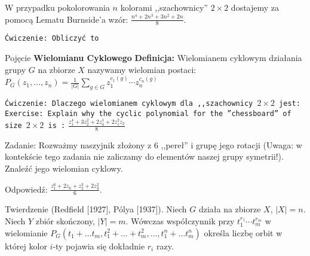 \documentclass{beamer}
\begin{document}
\begin{frame}
  W przypadku pokolorowania $n$ kolorami ,,szachownicy'' $2\times 2$
  dostajemy za pomocą Lematu Burnside'a wzór:
  $\frac{n^4 + 2 n^3 + 3 n^2 + 2 n }{8}$.

  {\tt Ćwiczenie: Obliczyć to}
  
\end{frame}

\begin{frame}
  \begin{block}{Pojęcie {\bf Wielomianu Cyklowego}}
    {\bf Definicja:} Wielomianem cyklowym działania grupy $G$
    na zbiorze $X$ nazywamy
    wielomian postaci:
    $P_G(z_1, \ldots, z_n) = \frac{1}{|G|} \sum_{g\in G} z_1^{c_1(g)} \cdots z_n^{c_n(g)}$
    
    
    \end{block}
  {\tt Ćwiczenie: Dlaczego wielomianem cyklowym dla ,,szachownicy $2\times 2$ jest:}
  {\tt Exercise: Explain why the cyclic polynomial for the ''chessboard'' of
    size $2\times 2$ is :}
  $\frac{z_1^4 + 3 z_2^2 + 2 z_4^1 + 2 z_1^2 z_2}{8}$

\end{frame}

\begin{frame}
  \begin{block}{Zadanie:}
    Rozważmy naszyjnik złożony z $6$ ,,pereł''
    i grupę jego rotacji (Uwaga: w kontekście tego zadania nie zaliczamy do elementów naszej grupy
    symetrii!).
    Znaleźć jego wielomian cyklowy.
  \end{block}
  Odpowiedź: $\frac{z_1^6 + 2 z_6 + z_2^3 + 2 z_3^2}{6}$.
\end{frame}

\begin{frame}
  Twierdzenie (Redfield [1927], P\'{o}lya [1937]). Niech $G$ działa na zbiorze
  $X$, $|X| = n$. Niech $Y$ zbiór skończony, $|Y| = m$.
  Wówczas współczynnik przy $t_1^{r_1} \cdots t_m^{r_m}$
  w wielomianie $P_G(t_1 + \ldots t_m, t_1^2 + \ldots + t_m^2, \ldots,
  t_1^n + \ldots t_m^n)$
  określa liczbę orbit w której kolor $i$-ty pojawia się dokładnie $r_i$ razy.
  \end{frame}
\end{document}

